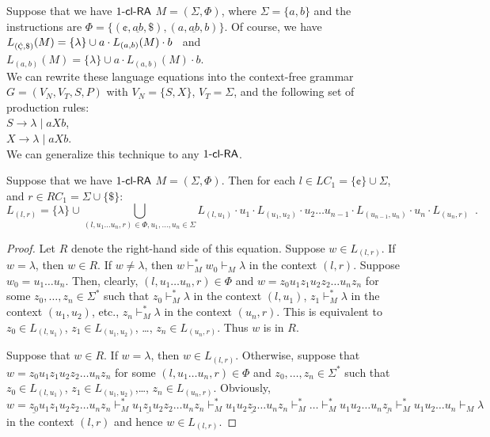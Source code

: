 \begin{example}
Suppose that we have $\kclRA[1]$ $M = (\Sigma, \Phi)$, where $\Sigma = \{a, b\}$ and the instructions are $\Phi = \{(\cent, \underline{ab}, \$), (a, \underline{ab}, b)\}$. Of course, we have\\
\indent $L_{({\small \cent},\$)}(M) = \{\lambda\} \cup a \cdot L_{(a,b)}(M) \cdot b$ \ and\\
\indent $L_{(a,b)}(M) = \{\lambda\} \cup a \cdot L_{(a,b)}(M) \cdot b$.\\
We can rewrite these language equations into the context-free grammar $G = (V_N, V_T, S, P)$ with $V_N = \{S, X\}$, $V_T = \Sigma$, and the following set of production rules:\\
\indent $S \to \lambda \mid a X b$,\\
\indent $X \to \lambda \mid a X b$.\\
We can generalize this technique to any $\kclRA[1]$.
\end{example}

\begin{lemma}\label{lemma:1clra}
Suppose that we have $\kclRA[1]$ $M = (\Sigma, \Phi)$.
Then for each $l \in LC_1 = \{\cent\} \cup \Sigma$, and $r \in RC_1 = \Sigma \cup \{\$\}$:
$$L_{(l,r)} = \{\lambda\} \cup \bigcup_{(l, u_1 \ldots u_n, r) \in \Phi, u_1,\ldots,u_n \in \Sigma}
L_{(l, u_1)} \cdot u_1 \cdot L_{(u_1, u_2)} \cdot u_2 \ldots u_{n-1} \cdot
L_{(u_{n-1}, u_n)} \cdot u_n \cdot L_{(u_n, r)}\enspace.$$
\end{lemma}

\begin{proof}
Let $R$ denote the right-hand side of this equation. Suppose $w \in L_{(l,r)}$. If $w = \lambda$, then $w \in R$. If $w \neq \lambda$, then $w \vdash_M^* w_0 \vdash_M \lambda$ in the context $(l,r)$. Suppose $w_0 = u_1 \ldots u_n$. Then, clearly, $(l, u_1 \ldots u_n, r) \in \Phi$ and $w = z_0 u_1 z_1 u_2 z_2 \ldots u_n z_n$ for some $z_0, \ldots, z_n \in \Sigma^*$ such that $z_0 \vdash_M^* \lambda$ in the context $(l, u_1)$, $z_1 \vdash_M^* \lambda$ in the context $(u_1, u_2)$, etc., $z_n \vdash_M^* \lambda$ in the context $(u_n, r)$. This is equivalent to $z_0 \in L_{(l,u_1)}$, $z_1 \in L_{(u_1, u_2)}$, \dots, $z_n \in L_{(u_n, r)}$. Thus $w$ is in  $R$.

Suppose that $w \in R$. If $w = \lambda$, then $w \in L_{(l,r)}$. Otherwise, suppose that $w = z_0 u_1 z_1 u_2 z_2 \ldots u_n z_n$ for some $(l, u_1 \ldots u_n, r) \in \Phi$ and $z_0, \ldots, z_n \in \Sigma^*$ such that $z_0 \in L_{(l,u_1)}$, $z_1 \in L_{(u_1, u_2)}$,\dots, $z_n \in L_{(u_n, r)}$. Obviously, $w = \underline{z_0} u_1 z_1 u_2 z_2 \ldots u_n z_n \vdash_M^* u_1 \underline{z_1} u_2 z_2 \ldots u_n z_n \vdash_M^* u_1 u_2 \underline{z_2} \ldots u_n z_n \vdash_M^* \ldots \vdash_M^* u_1 u_2 \ldots u_n \underline{z_n} \vdash_M^* u_1 u_2 \ldots u_n \vdash_M \lambda$ in the context $(l,r)$ and hence $w \in L_{(l,r)}$.
\end{proof}

